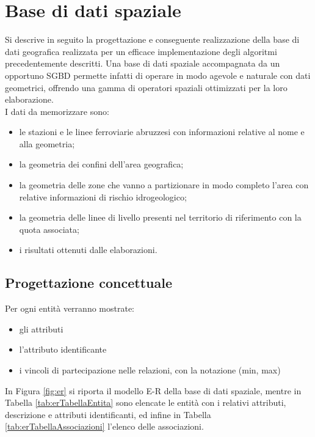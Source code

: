 \section{Base di dati spaziale}
Si descrive in seguito la progettazione e conseguente realizzazione della base di dati geografica realizzata per un efficace implementazione degli algoritmi precedentemente descritti. Una base di dati spaziale accompagnata da un opportuno SGBD permette infatti di operare in modo agevole e naturale con dati geometrici, offrendo una gamma di operatori spaziali ottimizzati per la loro elaborazione. \\
I dati da memorizzare sono: 
\begin{itemize}
\item le stazioni e le linee ferroviarie abruzzesi con informazioni relative al nome e alla geometria;
\item la geometria dei confini dell'area geografica;
\item la geometria delle zone che vanno a partizionare in modo completo l'area con relative informazioni di rischio idrogeologico;
\item la geometria delle linee di livello presenti nel territorio di riferimento con la quota associata;
\item i risultati ottenuti dalle elaborazioni.
\end{itemize}

 

\subsection{Progettazione concettuale}
Per ogni entità verranno mostrate:

\begin{itemize}
\item gli attributi
\item l'attributo identificante
\item i vincoli di partecipazione nelle relazioni, con la notazione (min, max)
\end{itemize}

In Figura \ref{fig:er} si riporta il modello E-R della base di dati spaziale, mentre in Tabella \ref{tab:erTabellaEntita} sono elencate le entità con i relativi attributi, descrizione e attributi identificanti, ed infine in Tabella \ref{tab:erTabellaAssociazioni} l’elenco delle associazioni.
\pagebreak

